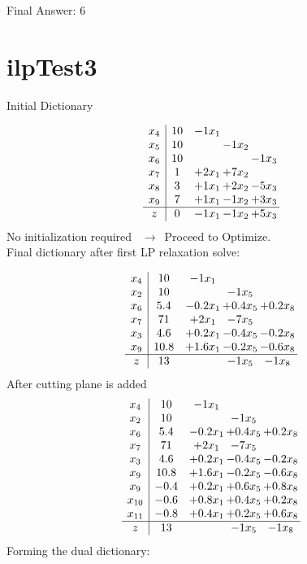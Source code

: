 \documentclass[11pt]{article}
\begin{document}
Final Answer: 6

\section{ilpTest3}

Initial Dictionary 

\[\begin{array}{c| c c@{\hskip 2pt} c@{\hskip 2pt} c@{\hskip 2pt} }
 x_{4}   &  10 & -1 x_{1} &    &   \\
 x_{5}   &  10  &   & -1 x_{2} &   \\
 x_{6}   &  10  &    &   & -1 x_{3}\\
 x_{7}   &  1 & + 2 x_{1} & + 7 x_{2} &   \\
 x_{8}   &  3 & + 1 x_{1} & + 2 x_{2} & -5 x_{3}\\
 x_{9}   &  7 & + 1 x_{1} & -1 x_{2} & + 3 x_{3}\\
\hline
z    &  0 & -1 x_{1} & -1 x_{2} & + 5 x_{3}\\
\end{array}\]
No initialization required \ $\rightarrow$\  Proceed to Optimize. \\ 
Final dictionary after first LP relaxation solve: 

\[\begin{array}{c| c c@{\hskip 2pt} c@{\hskip 2pt} c@{\hskip 2pt} }
 x_{4}   &  10 & -1 x_{1} &    &   \\
 x_{2}   &  10  &   & -1 x_{5} &   \\
 x_{6}   &  5.4 & -0.2 x_{1} & + 0.4 x_{5} & + 0.2 x_{8}\\
 x_{7}   &  71 & + 2 x_{1} & -7 x_{5} &   \\
 x_{3}   &  4.6 & + 0.2 x_{1} & -0.4 x_{5} & -0.2 x_{8}\\
 x_{9}   &  10.8 & + 1.6 x_{1} & -0.2 x_{5} & -0.6 x_{8}\\
\hline
z    &  13  &   & -1 x_{5} & -1 x_{8}\\
\end{array}\]
 After cutting plane is added 
\[\begin{array}{c| c c@{\hskip 2pt} c@{\hskip 2pt} c@{\hskip 2pt} }
 x_{4}   &  10 & -1 x_{1} &    &   \\
 x_{2}   &  10  &   & -1 x_{5} &   \\
 x_{6}   &  5.4 & -0.2 x_{1} & + 0.4 x_{5} & + 0.2 x_{8}\\
 x_{7}   &  71 & + 2 x_{1} & -7 x_{5} &   \\
 x_{3}   &  4.6 & + 0.2 x_{1} & -0.4 x_{5} & -0.2 x_{8}\\
 x_{9}   &  10.8 & + 1.6 x_{1} & -0.2 x_{5} & -0.6 x_{8}\\
 x_{9}   &  -0.4 & + 0.2 x_{1} & + 0.6 x_{5} & + 0.8 x_{8}\\
 x_{10}   &  -0.6 & + 0.8 x_{1} & + 0.4 x_{5} & + 0.2 x_{8}\\
 x_{11}   &  -0.8 & + 0.4 x_{1} & + 0.2 x_{5} & + 0.6 x_{8}\\
\hline
z    &  13  &   & -1 x_{5} & -1 x_{8}\\
\end{array}\]
Forming the dual dictionary:
\end{document}

